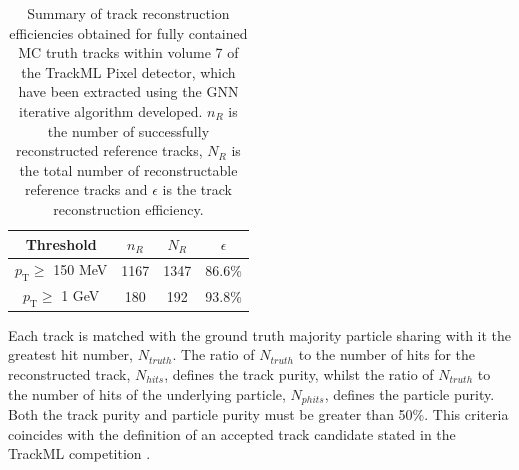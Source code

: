 \begin{table}[htbp]
\caption{Summary of track reconstruction efficiencies obtained for fully contained MC truth tracks within volume 7 of the TrackML Pixel detector, which have been extracted using the GNN iterative algorithm developed. $n_R$ is the number of successfully reconstructed reference tracks, $N_R$ is the total number of reconstructable reference tracks and $\epsilon$ is the track reconstruction efficiency. }

\begin{center}
\begin{tabular}{cccc}
\toprule
Threshold & $n_R$ & $N_R$ & $\epsilon$ \\
\hline
$p_{\text{T}} \ge$ 150 MeV    & 1167  & 1347  &  86.6\%    \\
$p_{\text{T}} \ge$ 1 GeV      & 180   & 192   &  93.8\%    \\
\bottomrule
\end{tabular}
\end{center}
\label{tab:trackml-track-recon-effs}
\end{table}





Each track is matched with the ground truth majority particle sharing with it the greatest hit number, $N_{truth}$. The ratio of $N_{truth}$ to the number of hits for the reconstructed track, $N_{hits}$, defines the track purity, whilst the ratio of $N_{truth}$ to the number of hits of the underlying particle, $N_{phits}$, defines the particle purity. Both the track purity and particle purity must be greater than 50\%. This criteria coincides with the definition of an accepted track candidate stated in the TrackML competition \cite{kaggle-trackml}.

